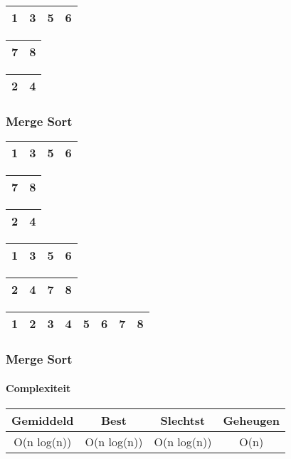 \begin{frame}
\begin{table}
\begin{tabular}{| c | c | c | c |}
\hline
1 & 3 & 5 & 6 \\ 
\hline
\end{tabular}
\quad
\begin{tabular}{| c | c |}
\hline
7 & 8 \\ 
\hline
\end{tabular}
\quad
\begin{tabular}{| c | c |}
\hline
\cellcolor{blue!25}2 & \cellcolor{blue!25}4 \\ 
\hline
\end{tabular}
\end{table}
\end{frame}


\begin{frame}
\frametitle{Merge Sort}
\begin{table}
\begin{tabular}{| c | c | c | c |}
\hline
1 & 3 & 5 & 6 \\ 
\hline
\end{tabular}
\quad
\begin{tabular}{| c | c |}
\hline
7 & 8 \\ 
\hline
\end{tabular}
\quad
\begin{tabular}{| c | c |}
\hline
\cellcolor{blue!25}2 & \cellcolor{blue!25}4 \\ 
\hline
\end{tabular}
\end{table}

\begin{table}
\begin{tabular}{| c | c | c | c |}
\hline
1 & 3 & 5 & 6\\ 
\hline
\end{tabular}
\quad
\begin{tabular}{| c | c | c | c |}
\hline
\cellcolor{blue!25}2 & \cellcolor{blue!25}4 & \cellcolor{blue!25}7 & \cellcolor{blue!25}8 \\ 
\hline
\end{tabular}
\end{table}

\begin{table}
\begin{tabular}{| c | c | c | c | c | c | c | c |}
\hline
\cellcolor{blue!25}1 & \cellcolor{blue!25}2 & \cellcolor{blue!25}3 & \cellcolor{blue!25}4 & \cellcolor{blue!25}5 & \cellcolor{blue!25}6 & \cellcolor{blue!25}7 & \cellcolor{blue!25}8 \\ 
\hline
\end{tabular}
\end{table}
\end{frame}

\begin{frame}
\frametitle{Merge Sort}
\framesubtitle{Complexiteit}
\begin{table}
\begin{tabular}{| c | c | c | c |}
\hline
Gemiddeld & Best & Slechtst & Geheugen\\ 
\hline
O(n log(n)) & O(n log(n)) & O(n log(n)) & O(n)\\
\hline
\end{tabular}
\end{table}
\end{frame}